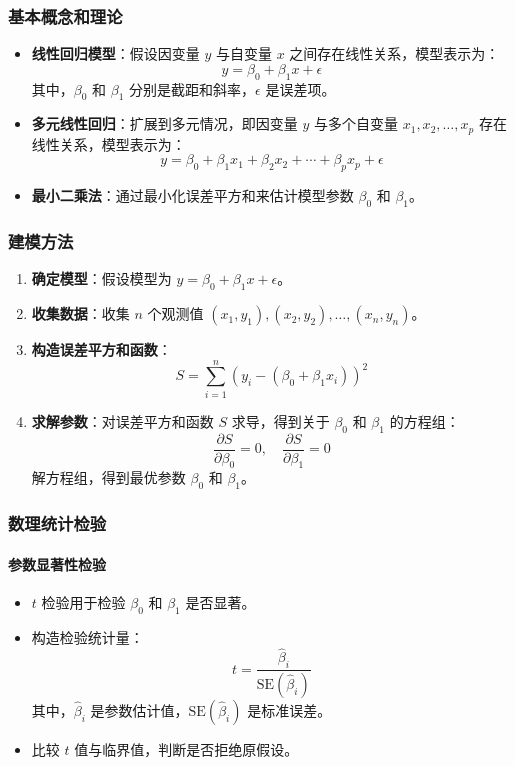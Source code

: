 \documentclass[UTF8]{ctexart}
\begin{document}
\subsubsection {基本概念和理论}
\begin{itemize}
    \item \textbf{线性回归模型}：假设因变量 \( y \) 与自变量 \( x \) 之间存在线性关系，模型表示为：
    \[
    y = \beta_0 + \beta_1 x + \epsilon
    \]
    其中，\(\beta_0\) 和 \(\beta_1\) 分别是截距和斜率，\(\epsilon\) 是误差项。
    \item \textbf{多元线性回归}：扩展到多元情况，即因变量 \( y \) 与多个自变量 \( x_1, x_2, \ldots, x_p \) 存在线性关系，模型表示为：
    \[
    y = \beta_0 + \beta_1 x_1 + \beta_2 x_2 + \cdots + \beta_p x_p + \epsilon
    \]
    \item \textbf{最小二乘法}：通过最小化误差平方和来估计模型参数 \(\beta_0\) 和 \(\beta_1\)。
\end{itemize}

\subsubsection {建模方法}
\begin{enumerate}
    \item \textbf{确定模型}：假设模型为 \( y = \beta_0 + \beta_1 x + \epsilon \)。
    \item \textbf{收集数据}：收集 \( n \) 个观测值 \((x_1, y_1), (x_2, y_2), \ldots, (x_n, y_n) \)。
    \item \textbf{构造误差平方和函数}：
    \[
    S = \sum_{i=1}^{n} (y_i - (\beta_0 + \beta_1 x_i))^2
    \]
    \item \textbf{求解参数}：对误差平方和函数 \( S \) 求导，得到关于 \(\beta_0\) 和 \(\beta_1\) 的方程组：
    \[
    \frac{\partial S}{\partial \beta_0} = 0, \quad \frac{\partial S}{\partial \beta_1} = 0
    \]
    解方程组，得到最优参数 \(\beta_0\) 和 \(\beta_1\)。
\end{enumerate}

\subsubsection {数理统计检验}
\paragraph{参数显著性检验}
\begin{itemize}
    \item \(t\) 检验用于检验 \(\beta_0\) 和 \(\beta_1\) 是否显著。
    \item 构造检验统计量：
    \[
    t = \frac{\hat{\beta}_i}{\text{SE}(\hat{\beta}_i)}
    \]
    其中，\(\hat{\beta}_i\) 是参数估计值，\(\text{SE}(\hat{\beta}_i)\) 是标准误差。
    \item 比较 \(t\) 值与临界值，判断是否拒绝原假设。
\end{itemize}
\end{document}
